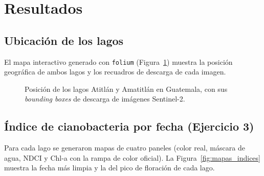 \documentclass[12pt, a4paper]{article}
\begin{document}
\section{Resultados}

\subsection{Ubicación de los lagos}

El mapa interactivo generado con \texttt{folium} (Figura~\ref{fig:mapa_lagos}) muestra la
posición geográfica de ambos lagos y los recuadros de descarga de cada imagen.

\begin{figure}[H]
  \centering
  \caption{Posición de los lagos Atitlán y Amatitlán en Guatemala, con sus \emph{bounding boxes} de descarga de imágenes Sentinel-2.}
  \label{fig:mapa_lagos}
\end{figure}

\subsection{Índice de cianobacteria por fecha (Ejercicio 3)}

Para cada lago se generaron mapas de cuatro paneles (color real, máscara de agua, NDCI y
Chl-a con la rampa de color oficial). La Figura~\ref{fig:mapas_indices} muestra la fecha
más limpia y la del pico de floración de cada lago.
\end{document}
